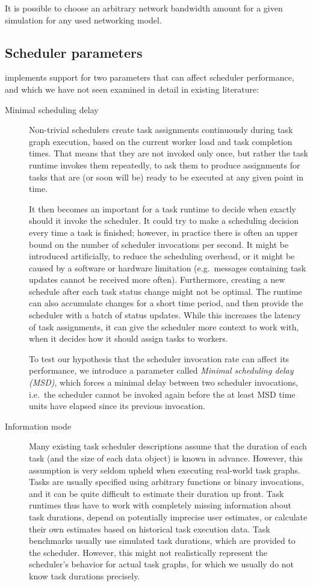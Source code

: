 It is possible to choose an arbitrary network bandwidth amount for a given simulation for any used
networking model.

\subsection{Scheduler parameters}
\estee{} implements support for two parameters that can affect scheduler performance,
and which we have not seen examined in detail in existing literature:
\begin{description}
	\item[Minimal scheduling delay] Non-trivial schedulers create task assignments continuously during task graph execution, based on
		the current worker load and task completion times. That means that they are not invoked only once,
		but rather the task runtime invokes them repeatedly, to ask them to produce assignments for tasks
		that are (or soon will be) ready to be executed at any given point in time.

		It then becomes an important for a task runtime to decide when exactly should it invoke the
		scheduler. It could try to make a scheduling decision every time a task is finished; however, in
		practice there is often an upper bound on the number of scheduler invocations per second. It might
		be introduced artificially, to reduce the scheduling overhead, or it might be caused by a software
		or hardware limitation (e.g.\ messages containing task updates cannot be received more often).
		Furthermore, creating a new schedule after each task status change might not be optimal. The
		runtime can also accumulate changes for a short time period, and then provide the scheduler with a
		batch of status updates. While this increases the latency of task assignments, it can give the
		scheduler more context to work with, when it decides how it should assign tasks to workers.

		To test our hypothesis that the scheduler invocation rate can affect its performance, we introduce
		a parameter called \emph{Minimal scheduling delay (MSD)}, which forces a minimal delay between two scheduler
		invocations, i.e.\ the scheduler cannot be invoked again before the at least MSD time units have
		elapsed since its previous invocation.
	\item[Information mode] Many existing task scheduler descriptions assume that the duration of each task (and the size of
		each data object) is known in advance. However, this assumption is very seldom upheld when
		executing real-world task graphs. Tasks are usually specified using arbitrary functions or binary
		invocations, and it can be quite difficult to estimate their duration up front. Task runtimes thus
		have to work with completely missing information about task durations, depend on potentially
		imprecise user estimates, or calculate their own estimates based on historical task execution data.
		Task benchmarks usually use simulated task durations, which are provided to the scheduler. However,
		this might not realistically represent the scheduler's behavior for actual task graphs, for which
		we usually do not know task durations precisely.


\end{description}
